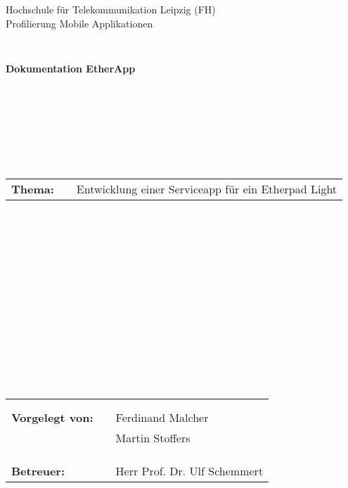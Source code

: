 \thispagestyle{empty}
\begin{center}
\Large{Hochschule für Telekommunikation Leipzig (FH)}\\

\Large{Profilierung Mobile Applikationen}\\
\end{center}
\begin{verbatim}


\end{verbatim}
\begin{center}
\textbf{\Huge{Dokumentation EtherApp}}
\end{center}
\begin{verbatim}








\end{verbatim}
\begin{flushleft}
\begin{tabular}{llp{12cm}}
\textbf{Thema:} & & \LARGE{Entwicklung einer Serviceapp für ein Etherpad Light}\\
\end{tabular}
\end{flushleft}
\begin{verbatim}
















\end{verbatim}
\begin{flushleft}
\begin{tabular}{lll}
& & \\
& & \\
\textbf{Vorgelegt von:} & & Ferdinand Malcher \\
                        & & Martin Stoffers \\
& & \\
& & \\
& & \\
\textbf{Betreuer:} & & Herr Prof. Dr. Ulf Schemmert
\end{tabular}
\end{flushleft}
